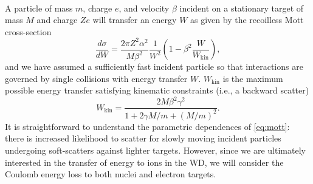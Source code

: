 \documentclass[twocolumn,preprintnumbers,amsmath,amssymb,prl, superscriptaddress]{revtex4}
\def\r{\right)}
\def\l{\left(}
\begin{document}
\begin{appendices}
\begin{align}
    
\end{align}


A particle of mass $m$, charge $e$, and velocity $\beta$ incident on a stationary target of mass $M$ and charge $Ze$ will transfer an energy $W$ as given by the recoilless Mott cross-section \cite{Rossi, Jackson}
\begin{equation}
  \frac{d \sigma}{dW} = \frac{2 \pi  Z^2 \alpha^2}{M \beta^2} \frac{1}{W^2}
    \l 1-\beta^2 \frac{W}{W_\text{kin}} \r,
\label{eq:mott}
\end{equation}
and we have assumed a sufficiently fast incident particle so that interactions are governed by single collisions with energy transfer $W$.
$W_\text{kin}$ is the maximum possible energy transfer satisfying kinematic constraints (i.e., a backward scatter)
\begin{equation}
\label{eq:ekin}
  W_{\text{kin}} = \frac{2 M \beta^2 \gamma^2}{1+ 2\gamma M/m +(M/m)^2}.
\end{equation}
It is straightforward to understand the parametric dependences of \eqref{eq:mott}: there is increased likelihood to scatter for slowly moving incident particles undergoing soft-scatters against lighter targets.
However, since we are ultimately interested in the transfer of energy to ions in the WD, we will consider the Coulomb energy loss to both nuclei and electron targets.


\end{appendices}
\end{document}
